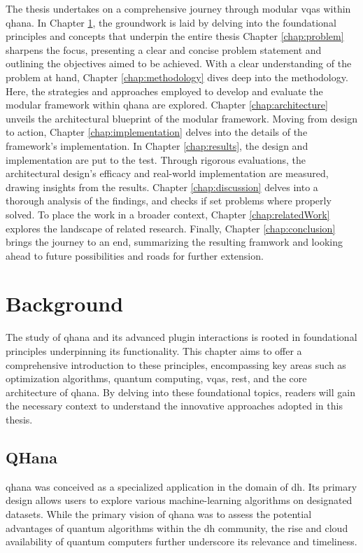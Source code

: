 \documentclass[
  a4paper,  %
  twoside,  %
  bibliography=totoc,
  headsepline,
  cleardoublepage=empty,
  parskip=half,
  draft=false
]{scrbook}
\begin{document}
The thesis undertakes on a comprehensive journey through modular \glspl{vqa} within \gls{qhana}.
In Chapter \ref{chap:background}, the groundwork is laid by delving into the foundational principles and concepts that underpin the entire thesis
Chapter \ref{chap:problem} sharpens the focus, presenting a clear and concise problem statement and outlining the objectives aimed to be achieved.
With a clear understanding of the problem at hand, Chapter \ref{chap:methodology} dives deep into the methodology.
Here, the strategies and approaches employed to develop and evaluate the modular framework within \gls{qhana} are explored.
Chapter \ref{chap:architecture} unveils the architectural blueprint of the modular framework.
Moving from design to action, Chapter \ref{chap:implementation} delves into the details of the framework's implementation.
In Chapter \ref{chap:results}, the design and implementation are put to the test. Through rigorous evaluations, the architectural design's efficacy and real-world implementation are measured, drawing insights from the results.
Chapter \ref{chap:discussion} delves into a thorough analysis of the findings, and checks if set problems where properly solved.
To place the work in a broader context, Chapter \ref{chap:relatedWork} explores the landscape of related research.
Finally, Chapter \ref{chap:conclusion} brings the journey to an end, summarizing the resulting framwork and looking ahead to future possibilities and roads for further extension.


\chapter{Background}
\label{chap:background}

The study of \gls{qhana} and its advanced plugin interactions is rooted in foundational principles underpinning its functionality.
This chapter aims to offer a comprehensive introduction to these principles, encompassing key areas such as optimization algorithms, quantum computing, \glspl{vqa}, \gls{rest}, and the core architecture of \gls{qhana}.
By delving into these foundational topics, readers will gain the necessary context to understand the innovative approaches adopted in this thesis.

\section{QHana}
\label{sec:qhana}

\gls{qhana} was conceived as a specialized application in the domain of \gls{dh}.
Its primary design allows users to explore various machine-learning algorithms on designated datasets.
While the primary vision of \gls{qhana} was to assess the potential advantages of quantum algorithms within the \gls{dh} community, the rise and cloud availability of quantum computers further underscore its relevance and timeliness.
\end{document}
